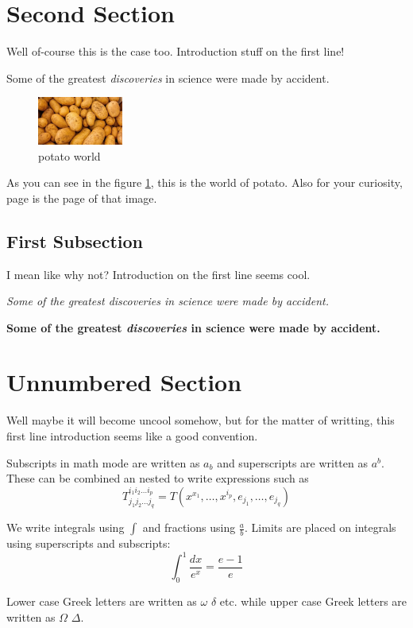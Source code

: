 \documentclass[12pt, letterpaper, oneside]{report}
\begin{document}
\section{Second Section}
Well of-course this is the case too. Introduction stuff on the first line!

Some of the greatest \emph{discoveries}
in science were made by accident.

\begin{figure}[h]
    \centering
    \includegraphics[width=0.25\textwidth]{potato}
    \caption{potato world}
    \label{bar}
\end{figure}

As you can see in the figure \ref{bar}, this is the world of potato. Also for your curiosity, page \pageref{bar} is the page of that image.

\subsection{First Subsection}
I mean like why not? Introduction on the first line seems cool.

\textit{Some of the greatest \emph{discoveries}
in science were made by accident.}

\textbf{Some of the greatest \emph{discoveries}
in science were made by accident.}

\section*{Unnumbered Section}
Well maybe it will become uncool somehow, but for the matter of writting, this first line introduction seems like a good convention.

Subscripts in math mode are written as $a_b$ and superscripts are written as $a^b$. These can be combined an nested to write expressions such as
\[ T^{i_1 i_2 \dots i_p}_{j_1 j_2 \dots j_q} =
T \left( x^{x_1}, \dots, x^{i_p}, e_{j_1}, \dots, e_{j_q} \right) \]

We write integrals using $\int$ and fractions using $\frac{a}{b}$. Limits are placed on integrals using superscripts and subscripts:
\[ \int_0^1 \frac{dx}{e^x} = \frac{e - 1}{e} \]

Lower case Greek letters are written as $\omega$ $\delta$ etc. while upper case Greek letters are written as $\Omega$ $\Delta$.
\end{document}

